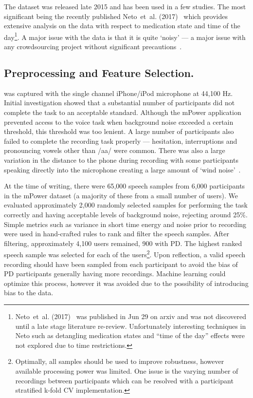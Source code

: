\documentclass[12pt, twoside]{book}
\renewcommand\emph[1]{\textit{\color{USred}{#1}}}
\begin{document}
The dataset was released late 2015 and has been used in a few studies. The most significant being the recently published Neto~et~al. (2017)~\cite{mpowerneto2017analysis} which provides extensive analysis on the data with respect to medication state and time of the day\footnote{Neto~et~al. (2017)~\cite{mpowerneto2017analysis} was published in Jun 29 on arxiv and was not discovered until a late stage literature re-review. Unfortunately interesting techniques in Neto such as detangling medication states and ``time of the day'' effects were not explored due to time restrictions.}. A major issue with the data is that it is quite `noisy' --- a major issue with any crowdsourcing project without significant precautions~\cite{crowdsourcing}. 


\subsection{Preprocessing and Feature Selection.}
\label{mpowerprocess}
\emph{Vowel phonation} was captured with the single channel iPhone/iPod microphone at 44,100 Hz. Initial investigation showed that a substantial number of participants did not complete the task to an acceptable standard. Although the mPower application prevented access to the voice task when background noise exceeded a certain threshold, this threshold was too lenient. A large number of participants also failed to complete the recording task properly --- hesitation, interruptions and pronouncing vowels other than /aa/ were common. There was also a large variation in the distance to the phone during recording with some participants speaking directly into the microphone creating a large amount of `wind noise'~\cite{windnoise}. 

At the time of writing, there were 65,000 speech samples from 6,000 participants in the mPower dataset (a majority of these from a small number of users). We evaluated approximately 2,000 randomly selected samples for performing the task correctly and having acceptable levels of background noise, rejecting around 25\%. Simple metrics such as variance in short time energy and noise prior to recording were used in hand-crafted rules to rank and filter the speech samples. After filtering, approximately 4,100 users remained, 900 with PD. The highest ranked speech sample was selected for each of the users\footnote{Optimally, all samples should be used to improve robustness, however available processing power was limited. One issue is the varying number of recordings between participants which can be resolved with a participant stratified k-fold CV implementation.}. Upon reflection, a valid speech recording should have been sampled from each participant to avoid the bias of PD participants generally having more recordings. Machine learning could optimize this process, however it was avoided due to the possibility of introducing bias to the data. 
\end{document}
